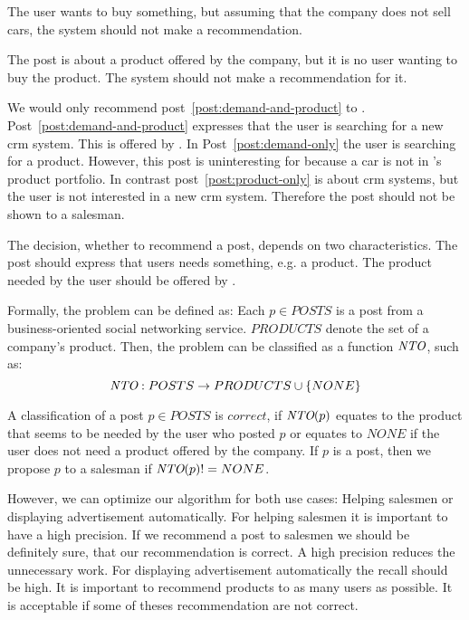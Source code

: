 \begin{post}
	\centering
	\caption{The user wants to buy something, but assuming that the company does not sell cars, the system should not make a recommendation.}
	\label{post:demand-only}
\end{post}

\begin{post}
	\centering
	\caption{The post is about a product offered by the company, but it is no user wanting to buy the product. The system should not make a recommendation for it.}
	\label{post:product-only}
\end{post}

We would only recommend post~\ref{post:demand-and-product} to \acme.
Post~\ref{post:demand-and-product} expresses that the user is searching for a new crm system.
This is offered by \acme.
In Post~\ref{post:demand-only} the user is searching for a product. 
However, this post is uninteresting for \acme because a car is not in \acme's product portfolio. 
In contrast post~\ref{post:product-only} is about crm systems, but the user is not interested in a new crm system.
Therefore the post should not be shown to a salesman.

The decision, whether to recommend a post, depends on two characteristics.
The post should express that users needs something, e.g. a product.
The product needed by the user should be offered by \acme.


Formally, the problem can be defined as: 
Each $p \in POSTS$ is a post from a business-oriented social networking service. $PRODUCTS$ denote the set of a company's product.
Then, the problem can be classified as a function $\emph{NTO}$, such as:
\begin{displaymath}
	\emph{NTO}: POSTS \to PRODUCTS \cup \{NONE\}
\end{displaymath}


A classification of a post $p \in POSTS$ is $correct$, if $\emph{NTO}(p)$ equates to the product that seems to be needed by the user who posted $p$ or equates to $NONE$ if the user does not need a product offered by the company. If $p$ is a post, then we propose $p$ to a salesman if $\emph{NTO}(p) != NONE$.

However, we can optimize our algorithm for both use cases: Helping salesmen or displaying advertisement automatically.
For helping salesmen it is important to have a high precision. 
If we recommend a post to salesmen we should be definitely sure, that our recommendation is correct. 
A high precision reduces the unnecessary work.
For displaying advertisement automatically the recall should be high. 
It is important to recommend products to as many users as possible.
It is acceptable if some of theses recommendation are not correct.   

